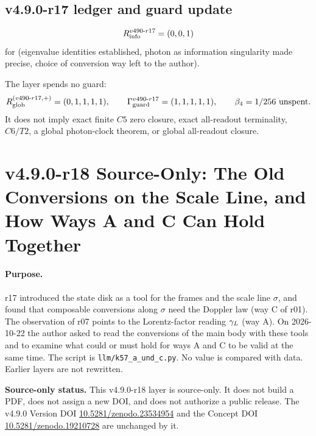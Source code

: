 \subsection*{v4.9.0-r17 ledger and guard update}
\label{subsec:v490-r17-ledger-guard}

\[
R_{\rm info}^{v490\text{-}r17}=(0,0,1)
\]
for (eigenvalue identities established, photon as information singularity made precise, choice of conversion way left to the
author).

The layer spends no guard:
\[
R_{\rm glob}^{(v490\text{-}r17,+)}=(0,1,1,1,1),
\qquad
\Gamma_{\rm guard}^{v490\text{-}r17}=(1,1,1,1,1),
\qquad
\beta_4=1/256\ \text{unspent}.
\]
It does not imply exact finite \(C5\) zero closure, exact all-readout terminality,
\(C6/T2\), a global photon-clock theorem, or global all-readout closure.

\clearpage
\section*{v4.9.0-r18 Source-Only: The Old Conversions on the Scale Line, and How Ways A and C Can Hold Together}
\label{sec:v490-r18-scale-line-a-and-c}

\paragraph{Purpose.}
r17 introduced the state disk as a tool for the frames and the scale line \(\sigma\), and found that composable conversions
along \(\sigma\) need the Doppler law (way C of r01).  The observation of r07 points to the Lorentz-factor reading \(\gamma_L\)
(way A).  On 2026-10-22 the author asked to read the conversions of the main body with these tools and to examine what could
or must hold for ways A and C to be valid at the same time.  The script is \texttt{llm/k57\_a\_und\_c.py}.  No value is compared
with data.  Earlier layers are not rewritten.

\noindent\textbf{Source-only status.}
This v4.9.0-r18 layer is source-only.  It does not build a PDF, does not assign a new DOI,
and does not authorize a public release.  The v4.9.0 Version DOI
\href{https://doi.org/10.5281/zenodo.23534954}{10.5281/zenodo.23534954} and the Concept DOI
\href{https://doi.org/10.5281/zenodo.19210728}{10.5281/zenodo.19210728} are unchanged by it.

